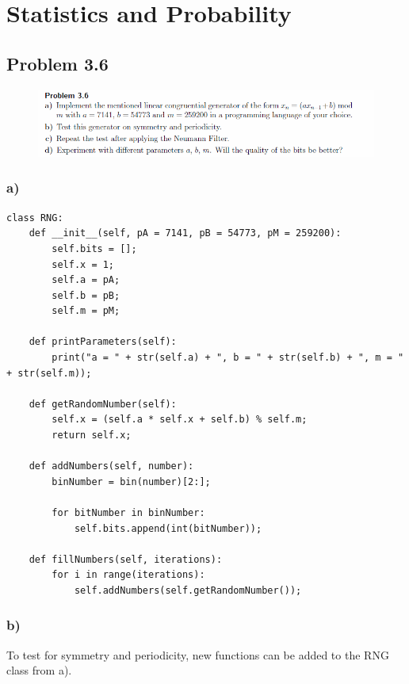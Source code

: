 \section{Statistics and Probability}


\subsection{Problem 3.6}


\begin{figure}[!ht]
\includegraphics[width=1\textwidth]{chapters/images/desc-3-6}
\end{figure}


\subsubsection{a)}

\begin{lstlisting}[caption=Problem 3.6 a)]
class RNG:
	def __init__(self, pA = 7141, pB = 54773, pM = 259200):
		self.bits = [];
		self.x = 1;
		self.a = pA;
		self.b = pB;
		self.m = pM;
	
	def printParameters(self):
		print("a = " + str(self.a) + ", b = " + str(self.b) + ", m = " + str(self.m));
	
	def getRandomNumber(self):
		self.x = (self.a * self.x + self.b) % self.m;
		return self.x;
	
	def addNumbers(self, number):
		binNumber = bin(number)[2:];
		
		for bitNumber in binNumber:
			self.bits.append(int(bitNumber));
	
	def fillNumbers(self, iterations):
		for i in range(iterations):
			self.addNumbers(self.getRandomNumber());
\end{lstlisting}


\subsubsection{b)}

To test for symmetry and periodicity, new functions can be added to the RNG class from a).

